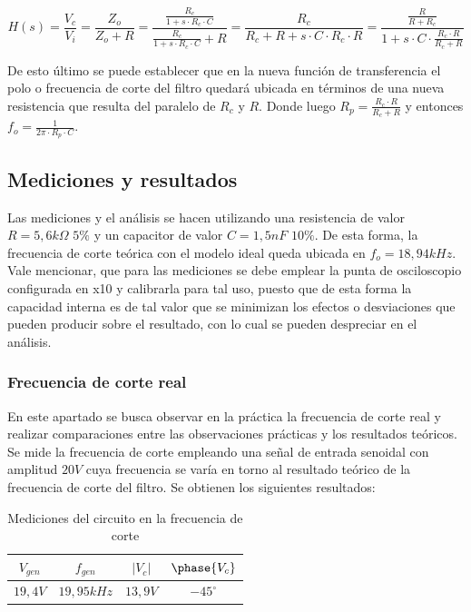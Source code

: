 \begin{equation}
	H(s) = \frac{V_c}{V_i} = \frac{Z_o}{Z_o + R}
	= \frac{ \frac{R_c}{1 + s \cdot R_c \cdot C} }{ \frac{R_c}{1 + s \cdot R_c \cdot C} + R}
	= \frac{R_c}{R_c + R + s \cdot C \cdot R_c \cdot R}
	= \frac{ \frac{R}{R + R_c} }{1 + s \cdot C \cdot \frac{R_c \cdot R}{R_c + R}}
	\label{eq:modelocap}
\end{equation}

De esto \'ultimo se puede establecer que en la nueva funci\'on de transferencia el polo o frecuencia de corte del filtro quedar\'a ubicada en t\'erminos de una nueva resistencia que resulta del paralelo de $R_c$ y $R$. Donde luego $R_p = \frac{R_c \cdot R}{R_c + R}$ y entonces $f_o = \frac{1}{2 \pi \cdot R_p \cdot C}$.

\subsection{Mediciones y resultados}

Las mediciones y el an\'alisis se hacen utilizando una resistencia de valor $R = 5,6k \Omega $ $5\%$ y un capacitor de valor $C = 1,5nF$ $10\%$. De esta forma, la frecuencia de corte te\'orica con el modelo ideal queda ubicada en $f_o = 18,94kHz$. Vale mencionar, que para las mediciones se debe emplear la punta de osciloscopio configurada en x10 y calibrarla para tal uso, puesto que de esta forma la capacidad interna es de tal valor que se minimizan los efectos o desviaciones que pueden producir sobre el resultado, con lo cual se pueden despreciar en el an\'alisis.

\subsubsection*{Frecuencia de corte real}

En este apartado se busca observar en la pr\'actica la frecuencia de corte real y realizar comparaciones entre las observaciones pr\'acticas y los resultados te\'oricos. Se mide la frecuencia de corte empleando una señal de entrada senoidal con amplitud $20 V$ cuya frecuencia se var\'ia en torno al resultado te\'orico de la frecuencia de corte del filtro. Se obtienen los siguientes resultados:

\begin{table}[H]
	\begin{center}
		\begin{tabular}{c c c c}
		$V_{gen}$ & $f_{gen}$ & $|V_c|$ & $\phase{V_c}$ \\
		\hline
		$19,4 V$ & $19,95kHz$ & $13,9 V$ & $-45^{ \circ}$
		\end{tabular}
		
		\caption{Mediciones del circuito en la frecuencia de corte}
	\end{center}
\end{table}

